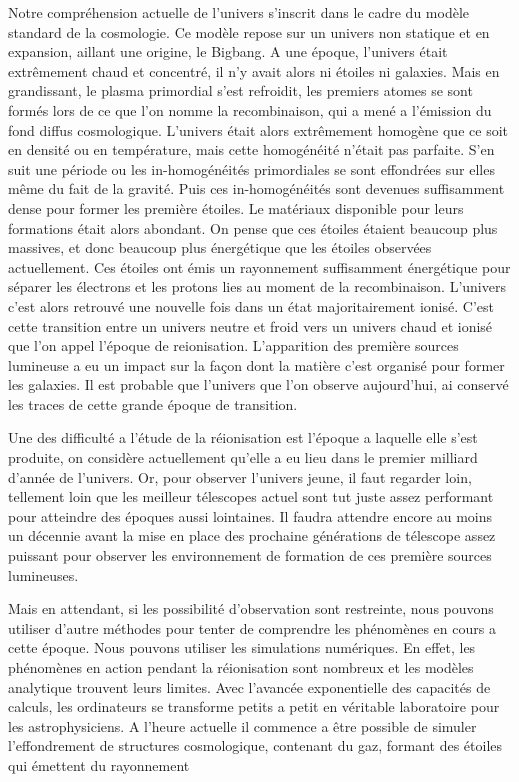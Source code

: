 Notre compréhension actuelle de l'univers s'inscrit dans le cadre du modèle standard de la cosmologie.
Ce modèle repose sur un univers non statique et en expansion, aillant une origine, le Bigbang.
A une époque, l'univers était extrêmement chaud et concentré, il n'y avait alors ni étoiles ni galaxies.
Mais en grandissant,  le plasma primordial s'est refroidit, les premiers atomes se sont formés lors de ce que l'on nomme la recombinaison, qui a mené a l'émission du fond diffus cosmologique.
L'univers était alors extrêmement homogène que ce soit en densité ou en température, mais cette homogénéité n'était pas parfaite.
S'en suit une période ou les in-homogénéités primordiales se sont effondrées sur elles même du fait de la gravité.
Puis ces in-homogénéités sont devenues suffisamment dense pour former les première étoiles.
Le matériaux disponible pour leurs formations était alors abondant.
On pense que ces étoiles étaient beaucoup plus massives, et donc beaucoup plus énergétique que les étoiles observées actuellement.
Ces étoiles ont émis un rayonnement suffisamment énergétique pour séparer les électrons et les protons lies au moment de la recombinaison.
L'univers c'est alors retrouvé une nouvelle fois dans un état majoritairement ionisé. 
C'est cette transition entre un univers neutre et froid vers un univers chaud et ionisé que l'on appel l'époque de reionisation.
L'apparition des première sources lumineuse a eu un impact sur la façon dont la matière c'est organisé pour former les galaxies.
Il est probable que l'univers que l'on observe aujourd'hui, ai conservé les traces de cette grande époque de transition.

Une des difficulté a l'étude de la réionisation est l'époque a laquelle elle s'est produite, on considère actuellement qu'elle a eu lieu dans le premier milliard d'année de l'univers.
Or, pour observer l'univers jeune, il faut regarder loin, tellement loin que les meilleur télescopes actuel sont tut juste assez performant pour atteindre des époques aussi lointaines.
Il faudra attendre encore au moins un décennie avant la mise en place des prochaine générations de télescope assez puissant pour observer les environnement de formation de ces première sources lumineuses.

Mais en attendant, si les possibilité d'observation sont restreinte, nous pouvons utiliser d'autre méthodes pour tenter de comprendre les phénomènes en cours a cette époque.
Nous pouvons utiliser les simulations numériques.
En effet, les phénomènes en action pendant la réionisation sont nombreux et les modèles analytique trouvent leurs limites.
Avec l'avancée exponentielle des capacités de calculs, les ordinateurs se transforme petits a petit en véritable laboratoire pour les astrophysiciens.
A l'heure actuelle il commence a être possible de simuler l'effondrement de structures cosmologique, contenant du gaz, formant des étoiles qui émettent du rayonnement 

